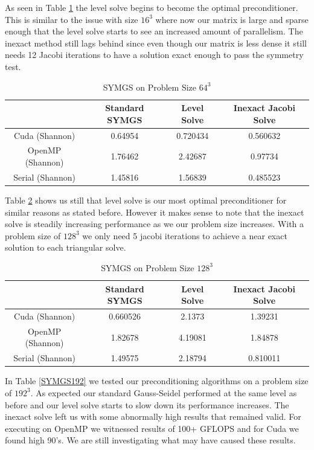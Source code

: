 \documentclass{ccr15}
\begin{document}
As seen in Table \ref{SYMGS64} the level solve begins to become the optimal preconditioner. This
is similar to the issue with size $16^3$ where now our matrix is large and sparse enough that
the level solve starts to see an increased amount of parallelism. The inexact method still lags
behind since even though our matrix is less dense it still needs 12 Jacobi iterations to have
a solution exact enough to pass the symmetry test.

\begin{table}[h]
\begin{center}
\begin{tabular}{|c||c|c|c|}
\hline
& Standard SYMGS & Level Solve & Inexact Jacobi Solve \\
\hline \hline
Cuda (Shannon) & 0.64954 & 0.720434 & 0.560632 \\
\hline
OpenMP (Shannon) & 1.76462 & 2.42687 & 0.97734 \\
\hline
Serial (Shannon) & 1.45816 & 1.56839 & 0.485523 \\
\hline
\end{tabular}
\caption{SYMGS on Problem Size $64^3$}
\label{SYMGS64}
\end{center}
\end{table}

Table \ref{SYMGS128} shows us still that level solve is our most optimal preconditioner for
similar reasons as stated before. However it makes sense to note that the inexact solve is
steadily increasing performance as we our problem size increases. With a problem size of $128^3$
we only need 5 jacobi iterations to achieve a near exact solution to each triangular solve.

\begin{table}[h]
\begin{center}
\begin{tabular}{|c||c|c|c|}
\hline
& Standard SYMGS & Level Solve & Inexact Jacobi Solve \\
\hline \hline
Cuda (Shannon) & 0.660526 & 2.1373 & 1.39231 \\
\hline
OpenMP (Shannon) & 1.82678 & 4.19081 & 1.84878 \\
\hline
Serial (Shannon) & 1.49575 & 2.18794 & 0.810011 \\
\hline
\end{tabular}
\caption{SYMGS on Problem Size $128^3$}
\label{SYMGS128}
\end{center}
\end{table}

In Table \ref{SYMGS192} we tested our preconditioning algorithms on a problem size of $192^3$. As
expected our standard Gauss-Seidel performed at the same level as before and our level solve
starts to slow down its performance increases. The inexact solve left us with some abnormally
high results that remained valid. For executing on OpenMP we witnessed results of 100+ GFLOPS
and for Cuda we found high 90's. We are still investigating what may have caused these results.
\end{document}
